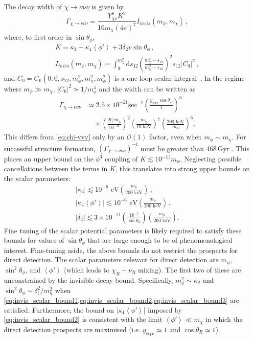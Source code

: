 \documentclass[aps, prd, reprint, nofootinbib, amsmath, amssymb, floatfix]{revtex4-2}
\newcommand{\vev}[1]{\left< #1 \right>}      %
\begin{document}
The decay width of $\chi\to\nu\nu\nu$ is given by
%
\begin{equation} \label{eq:chi-vvv}
    \Gamma_{\chi\to\nu\nu\nu} = \frac{Y_{\chi\nu}^6 K^2}{16 m_\chi (4\pi)^7} I_{invis}(m_\phi,m_\chi) \,,
\end{equation}
%
where, to first order in $\sin\theta_\phi$,
%
\begin{gather}
    K = \kappa_3 + \kappa_4\vev{\phi'} + 3\delta_2v\sin\theta_\phi \,, \\
    I_{invis}(m_\phi,m_\chi) = \int_0^{m_\chi^2} \text{d}s_{12}\left(\frac{m_\chi^2 - s_{12}}{m_\phi^2 - s_{12}}\right)^2 s_{12} |C_0|^2 \,,
\end{gather}
%
and $C_0 = C_0(0,0,s_{12},m_\phi^2,m_\chi^2,m_\phi^2)$ is a one-loop scalar integral~\cite{tHooft:1978jhc}. In the regime where $m_\phi \gg m_\chi$, $|C_0|^2 \simeq 1/m_\phi^4$ and the width can be written as
%
\begin{align}
    \Gamma_{\chi\to\nu\nu\nu} & \simeq 2.5 \times 10^{-21} \text{sec}^{-1} \left(\frac{y_{\phi\chi\nu}\cos\theta_R}{1}\right)^6 \nonumber \\
    & \quad \times \left(\frac{K/m_\phi}{10^{-11}}\right)^2 \left(\frac{m_\chi}{10\text{ keV}}\right)^7 \left(\frac{200 \text{ keV}}{m_\phi}\right)^6.
\end{align}
%
This differs from \cref{eq:chi-vvv} only by an $\mathcal{O}(1)$ factor, even when $m_\phi \sim m_\chi$. For successful structure formation, $(\Gamma_{\chi\to\nu\nu\nu})^{-1}$ must be greater than 468\,Gyr \cite{FrancoAbellan:2021sxk}. This places an upper bound on the $\phi^3$ coupling of $K \lesssim 10^{-11} m_\phi$. Neglecting possible cancellations between the terms in $K$, this translates into strong upper bounds on the scalar parameters:
%
\begin{gather}
    |\kappa_3| \lesssim 10^{-6} \text{ eV} \left(\frac{m_\phi}{200\text{ keV}}\right)\label{eq:invis_scalar_bound1} \,,\\
    |\kappa_4\vev{\phi'}| \lesssim 10^{-6} \text{ eV} \left(\frac{m_\phi}{200\text{ keV}}\right)\label{eq:invis_scalar_bound2} \,,\\
    |\delta_2| \lesssim 3\times10^{-11}\left(\frac{10^{-7}}{\sin\theta_\phi}\right)\left(\frac{m_\phi}{200 \text{ keV}}\right) \label{eq:invis_scalar_bound3}.
\end{gather}
%
Fine tuning of the scalar potential parameters is likely required to satisfy these bounds for values of $\sin\theta_\phi$ that are large enough to be of phenomenological interest. Fine-tuning aside, the above bounds do not restrict the prospects for direct detection. The scalar parameters relevant for direct detection are $m_\phi$, $\sin^2\theta_\phi$, and $\vev{\phi'}$ (which leads to $\chi_R-\nu_R$ mixing). The first two of these are unconstrained by the invisible decay bound. Specifically, $m_\phi^2 \sim \kappa_2$ and $\sin^2\theta_\phi \sim \delta_1^2/m_h^2$ when \cref{eq:invis_scalar_bound1,eq:invis_scalar_bound2,eq:invis_scalar_bound3} are satisfied. Furthermore, the bound on $|\kappa_4\vev{\phi'}$| imposed by \cref{eq:invis_scalar_bound2} is consistent with the limit $\vev{\phi'} \ll m_\chi$ in which the direct detection prospects are maximised (i.e. $y_{\phi\chi\nu}\simeq1$ and $\cos\theta_R\simeq1$).
\end{document}
